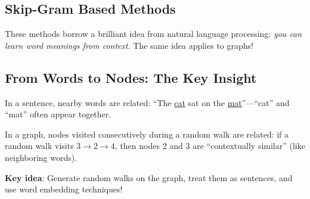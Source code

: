 \begin{notechapter}
\section{Skip-Gram Based Methods}

These methods borrow a brilliant idea from natural language processing: \emph{you can learn word meanings from context}. The same idea applies to graphs!

\subsection{From Words to Nodes: The Key Insight}

\begin{intuition}
In a sentence, nearby words are related: ``The \underline{cat} sat on the \underline{mat}''---``cat'' and ``mat'' often appear together.

In a graph, nodes visited consecutively during a random walk are related: if a random walk visits $3 \to 2 \to 4$, then nodes 2 and 3 are ``contextually similar'' (like neighboring words).

\textbf{Key idea}: Generate random walks on the graph, treat them as sentences, and use word embedding techniques!
\end{intuition}

\begin{figure}[htbp]
\centering
{}
\end{figure}
\end{notechapter}
